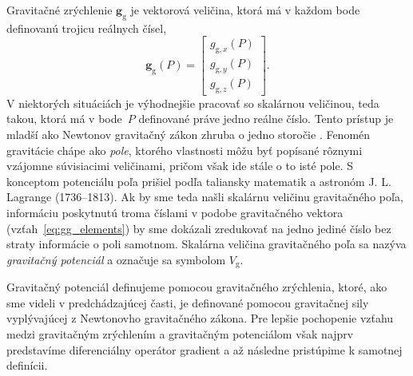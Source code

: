 \documentclass[a4paper, 12pt]{book}
\newcommand{\gidx}{\mathrm g}
\let\vec\mathbf
\begin{document}
Gravitačné zrýchlenie $\vec g_\gidx$ je vektorová veličina, ktorá má v každom 
bode definovanú trojicu reálnych čísel,
%
\begin{equation}
\label{eq:gg_elements}
\vec g_{\gidx}(P) =
\begin{bmatrix}
g_{\gidx,x}(P) \\[2ex]
g_{\gidx,y}(P) \\[2ex]
g_{\gidx,z}(P)
\end{bmatrix}
{.}
\end{equation}
%
V niektorých situáciách je výhodnejšie pracovať so skalárnou veličinou, teda 
takou, ktorá má v bode~$P$ definované práve jedno reálne číslo.  Tento prístup 
je mladší ako Newtonov gravitačný zákon zhruba o jedno storočie 
\citep{MacMillan1930,Jekeli2015}.  Fenomén gravitácie chápe ako \emph{pole}, 
ktorého vlastnosti môžu byť popísané rôznymi vzájomne súvisiacimi veličinami, 
pričom však ide stále o to isté pole.  S konceptom potenciálu poľa prišiel 
podľa \cite{MacMillan1930} taliansky matematik a astronóm J. L. Lagrange 
(1736--1813).  Ak by sme teda našli skalárnu veličinu gravitačného poľa, 
informáciu poskytnutú troma číslami v podobe gravitačného vektora 
(vzťah~\ref{eq:gg_elements}) by sme dokázali zredukovať na jedno jediné číslo 
bez straty informácie o poli samotnom.  Skalárna veličina gravitačného poľa sa 
nazýva \emph{gravitačný potenciál} a označuje sa symbolom $V_\gidx$.

Gravitačný potenciál definujeme pomocou gravitačného zrýchlenia, ktoré, ako sme 
videli v predchádzajúcej časti, je definované pomocou gravitačnej sily 
vyplývajúcej z Newtonovho gravitačného zákona.  Pre lepšie pochopenie vzťahu 
medzi gravitačným zrýchlením a gravitačným potenciálom však najprv predstavíme 
diferenciálny operátor gradient a až následne pristúpime k samotnej definícii.
\end{document}
